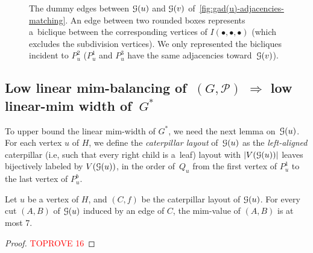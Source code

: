 \documentclass[a4paper,UKenglish,cleveref,hyperref,autoref]{lipics-v2021}
\begin{document}
\begin{figure}[h!]
  \caption{The dummy edges between $\mathcal G(u)$ and $\mathcal G(v)$ of~\cref{fig:gad(u)-adjacencies-matching}.
  An edge between two rounded boxes represents a~biclique between the corresponding vertices of $I(\bullet,\bullet,\bullet)$ (which excludes the subdivision vertices).
  We only represented the bicliques incident to $P_u^2$ ($P_u^1$ and $P_u^3$ have the same adjacencies toward~$\mathcal G(v)$). }
  \label{fig:gad(u)-adjacencies-dummy}
\end{figure}

\subsection{Low linear mim-balancing of~$(G,\mathcal P)$ $\Rightarrow$ low linear-mim width of~$G^*$}\label{sec:lin-mim-balancing-to-lin-mim-width}

To upper bound the linear mim-width of $G^*$, we need the next lemma on~$\mathcal G(u)$.
For each vertex $u$ of $H$, we define the \emph{caterpillar layout} of~$\mathcal G(u)$ as the \emph{left-aligned} caterpillar (i.e, such that every right child is a~leaf) layout with $|V(\mathcal G(u))|$ leaves bijectively labeled by $V(\mathcal G(u))$, in the order of~$Q_u$ from the first vertex of $P_u^1$ to the last vertex of $P_u^b$.

\begin{lemma}\label{lem:mim-value:gadget}
Let $u$ be a vertex of $H$, and $(C,f)$ be the caterpillar layout of $\mathcal G(u)$. 
For every cut $(A,B)$ of $\mathcal G(u)$ induced by an edge of $C$, the mim-value of $(A,B)$ is at most 7.
\end{lemma}
\begin{proof}\textcolor{red}{TOPROVE 16}\end{proof}
\end{document}
